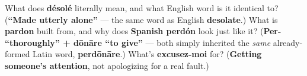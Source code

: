 \begin{tcolorbox}[breakable,colback=teal!4,colframe=teal!35!black,title={Before you move on}]
What does \textbf{désolé} literally mean, and what English word is it identical to? (\textbf{\textquotedblleft{}Made utterly alone\textquotedblright{}} — the same word as English \textbf{desolate}.) What is \textbf{pardon} built from, and why does \textbf{Spanish perdón} look just like it? (\textbf{Per- \textquotedblleft{}thoroughly\textquotedblright{} + dōnāre \textquotedblleft{}to give\textquotedblright{}} — both simply inherited the \emph{same} already-formed Latin word, \textbf{perdōnāre}.) What's \textbf{excusez-moi} for? (\textbf{Getting someone's attention}, not apologizing for a real fault.)
\end{tcolorbox}
